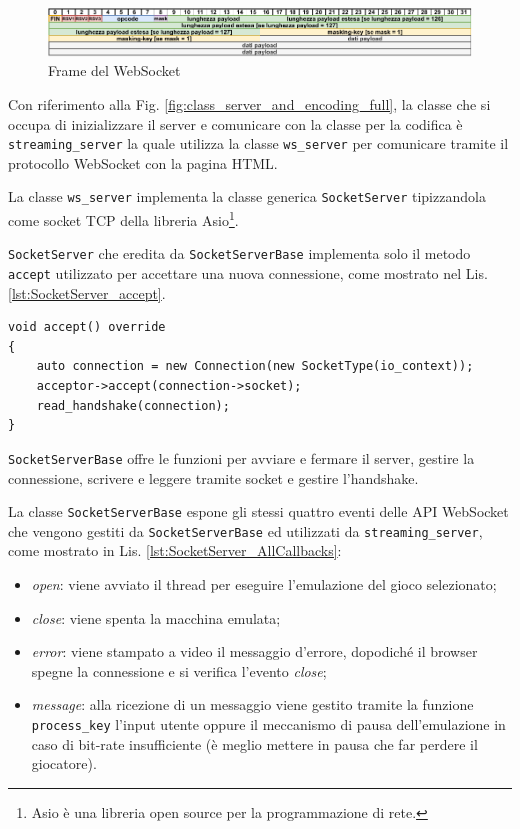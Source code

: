 \begin{figure}[H]
	\includegraphics[width=\linewidth]{immagini/dataframe_websocket}
	\caption{Frame del WebSocket}
	\label{fig:dataframe_websocket}
\end{figure}

Con riferimento alla Fig. \ref{fig:class_server_and_encoding_full}, la classe che si occupa di inizializzare il server e comunicare con la classe per la codifica è \verb|streaming_server| la quale utilizza la classe \verb|ws_server| per comunicare tramite il protocollo WebSocket con la pagina HTML.

La classe \verb|ws_server| implementa la classe generica \verb|SocketServer| tipizzandola come socket TCP della libreria Asio\footnote{Asio è una libreria open source per la programmazione di rete.}.

\verb|SocketServer| che eredita da \verb|SocketServerBase| implementa solo il metodo \verb|accept| utilizzato per accettare una nuova connessione, come mostrato nel Lis. \ref{lst:SocketServer_accept}.

\begin{lstlisting}[caption=Funzione accept della classe SocketServer. File: \detokenize{lib/util/server_ws_impl.hpp}, label={lst:SocketServer_accept}]
void accept() override
{
	auto connection = new Connection(new SocketType(io_context));
	acceptor->accept(connection->socket);
	read_handshake(connection);
}
\end{lstlisting}

\verb|SocketServerBase| offre le funzioni per avviare e fermare il server, gestire la connessione, scrivere e leggere tramite socket e gestire l'handshake.

La classe \verb|SocketServerBase| espone gli stessi quattro eventi delle API WebSocket che vengono gestiti da \verb|SocketServerBase| ed utilizzati da \verb|streaming_server|, come mostrato in Lis. \ref{lst:SocketServer_AllCallbacks}:

\begin{itemize}
	\item \textit{open}: viene avviato il thread per eseguire l'emulazione del gioco selezionato;
	\item \textit{close}: viene spenta la macchina emulata;
	\item \textit{error}: viene stampato a video il messaggio d'errore, dopodiché il browser spegne la connessione e si verifica l'evento \textit{close};
	\item \textit{message}: alla ricezione di un messaggio viene gestito tramite la funzione \verb|process_key| l'input utente oppure il meccanismo di pausa dell'emulazione in caso di bit-rate insufficiente (è meglio mettere in pausa che far perdere il giocatore).
\end{itemize}

